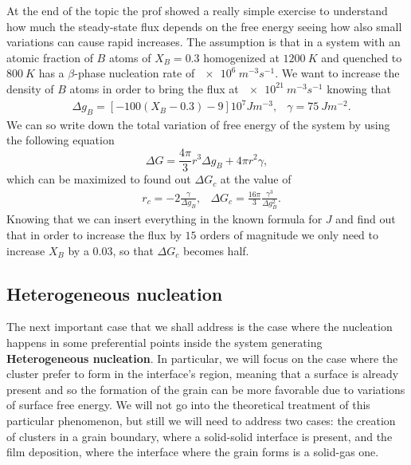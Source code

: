 {
    At the end of the topic the prof showed a really simple exercise to understand how much the steady-state flux depends on the free energy seeing how also small variations can cause rapid increases. The assumption is that in a system with an atomic fraction of $B$ atoms of $X_B = 0.3$ homogenized at $\SI{1200}{K}$ and quenched to $\SI{800}{K}$ has a $\beta$-phase nucleation rate of $\SI{e6}{m^{-3}s^{-1}}$. We want to increase the density of $B$ atoms in order to bring the flux at $\SI{e21}{m^{-3}s^{-1}}$ knowing that
    \begin{align}
        &\Delta g_B = [-100(X_B - 0.3) - 9]10^{7}\si{Jm^{-3}}, &\gamma = \SI{75}{Jm^{-2}}.
    \end{align}
    We can so write down the total variation of free energy of the system by using the following equation
    \begin{equation}
        \Delta G = \frac{4\pi}{3}r^3\Delta g_B + 4\pi r^2 \gamma,
    \end{equation}
    which can be maximized to found out $\Delta G_c$ at the value of
    \begin{align}
        &r_c = -2\frac{\gamma}{\Delta g_B}, &\Delta G_c = \frac{16\pi}{3}\frac{\gamma^3}{\Delta g_B^2}.
    \end{align}
    Knowing that we can insert everything in the known formula for $J$ and find out that in order to increase the flux by $15$ orders of magnitude we only need to increase $X_B$ by a $0.03$, so that $\Delta G_c$ becomes half.
}

\subsection{Heterogeneous nucleation}

The next important case that we shall address is the case where the nucleation happens in some preferential points inside the system generating \textbf{Heterogeneous nucleation}. In particular, we will focus on the case where the cluster prefer to form in the interface's region, meaning that a surface is already present and so the formation of the grain can be more favorable due to variations of surface free energy. We will not go into the theoretical treatment of this particular phenomenon, but still we will need to address two cases: the creation of clusters in a grain boundary, where a solid-solid interface is present, and the film deposition, where the interface where the grain forms is a solid-gas one.

